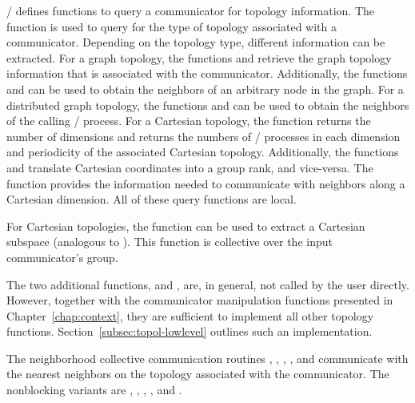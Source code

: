 
\MPI/ defines functions to query a communicator for topology information.
The function  is used to query for the type of topology
associated with a communicator. Depending on the topology type,
different information can be extracted. For a graph topology, the
functions  and  retrieve the graph topology information
that is associated with the communicator. Additionally, the
functions  and
 can be used
to obtain the neighbors of an arbitrary node in the graph. For a
distributed graph topology, the functions
and  can be used to obtain the neighbors of the
calling \MPI/ process. For a Cartesian topology, the function
 returns the number of dimensions and  returns the numbers of
\MPI/ processes in each dimension and periodicity of the associated Cartesian topology. Additionally, the functions
 and  translate Cartesian coordinates into a group rank, and
vice-versa. The function  provides the information needed
to communicate with neighbors along a Cartesian dimension. All of these
query functions are local.

For Cartesian topologies, the function
 can be used to extract a Cartesian subspace
(analogous to ). This function is collective
over the input communicator's group.

The two additional functions,  and
, are, in general, not called by the user directly. However,
together with the communicator manipulation functions presented in
Chapter~\ref{chap:context}, they are sufficient to implement all other
topology functions.  Section~\ref{subsec:topol-lowlevel} outlines such
an implementation.
 
The neighborhood collective communication routines
, , 
,\flushline %
,
and 
communicate with the nearest neighbors on the topology associated with
the communicator.
The nonblocking variants are
, , 
, ,
and .

